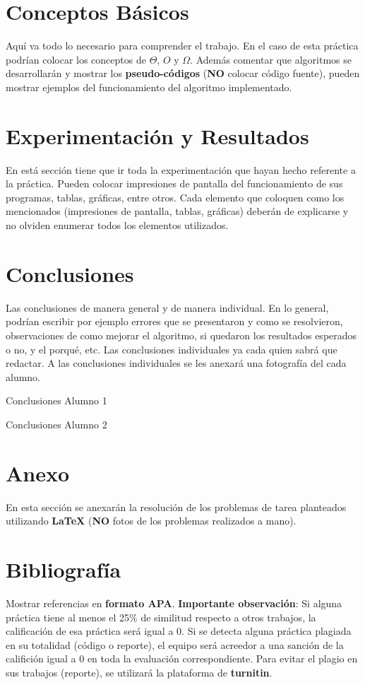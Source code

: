\documentclass[12pt,twoside]{article}
\begin{document}
\section{Conceptos B\'asicos}
Aqu\'i va todo lo necesario para comprender el trabajo. En el caso de esta pr\'actica podr\'ian colocar los conceptos de $\Theta$, $O$ y $\Omega$. Adem\'as comentar que algoritmos se desarrollar\'an y mostrar los \textbf{pseudo-c\'odigos} (\textbf{NO} colocar c\'odigo fuente), pueden mostrar ejemplos del funcionamiento del algoritmo implementado.

\section{Experimentaci\'on y Resultados}
En est\'a secci\'on tiene que ir toda la experimentaci\'on que hayan hecho referente a la pr\'actica. Pueden colocar impresiones de pantalla del funcionamiento de sus programas, tablas, gr\'aficas, entre otros. Cada elemento que coloquen como los mencionados (impresiones de pantalla, tablas, gr\'aficas) deber\'an de explicarse y no olviden enumerar todos los elementos utilizados.


\section{Conclusiones}
Las conclusiones de manera general y de manera individual. En lo general, podr\'ian escribir por ejemplo errores que se presentaron y como se resolvieron, observaciones de como mejorar el algoritmo, si quedaron los resultados esperados o no, y el porqu\'e, etc.
Las conclusiones individuales ya cada quien sabr\'a que redactar. A las conclusiones individuales se les anexar\'a una fotograf\'ia del cada alumno.

Conclusiones Alumno 1   

Conclusiones Alumno 2   




\section{Anexo}

En esta secci\'on se anexar\'an la resoluci\'on de los problemas de tarea planteados utilizando \textbf{LaTeX} (\textbf{NO} fotos de los problemas realizados a mano).




\section{Bibliograf\'ia}

Mostrar referencias en \textbf{formato APA}. \textbf{Importante observaci\'on}: Si alguna pr\'actica tiene al menos el 25$\%$ de similitud respecto a otros trabajos, la calificaci\'on de esa pr\'actica ser\'a igual a 0. Si se detecta alguna pr\'actica plagiada en su totalidad (c\'odigo o reporte), el equipo ser\'a acreedor a una sanci\'on de la califici\'on igual a 0 en toda la evaluaci\'on correspondiente. Para evitar el plagio en sus trabajos (reporte), se utilizar\'a la plataforma de \textbf{turnitin}.

\medskip




\end{document}
